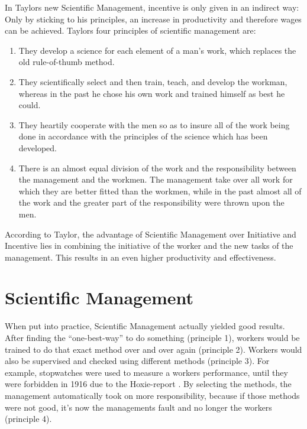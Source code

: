 \documentclass[a4paper,11pt]{article}
\newcommand{\enquote}[1]{``#1''}
\begin{document}
In Taylors new Scientific Management, incentive is only given in an indirect
way: Only by sticking to his principles, an increase in productivity and
therefore wages can be achieved. Taylors four principles of scientific
management are:
\begin{enumerate}
\item They develop a science for each element of a man's work, which replaces
  the old rule-of-thumb method.
\item They scientifically select and then train, teach, and develop the
  workman, whereas in the past he chose his own work and trained himself as
  best he could.
\item They heartily cooperate with the men so as to insure all of the work
  being done in accordance with the principles of the science which has been
  developed.
\item There is an almost equal division of the work and the responsibility
  between the management and the workmen. The management take over all work
  for which they are better fitted than the workmen, while in the past almost
  all of the work and the greater part of the responsibility were thrown upon
  the men.
\end{enumerate}

According to Taylor, the advantage of Scientific Management over Initiative
and Incentive lies in combining the initiative of the worker and the new tasks
of the management. This results in an even higher productivity and
effectiveness.

\section{Scientific Management}
When put into practice, Scientific Management actually yielded good
results. After finding the \enquote{one-best-way} to do something (principle
1), workers would be trained to do that exact method over and over again
(principle 2). Workers would also be supervised and checked using different
methods (principle 3). For example, stopwatches were used to measure a workers
performance, until they were forbidden in 1916 due to the Hoxie-report
\cite{hoxie}. By selecting the methods, the management automatically took on
more responsibility, because if those methods were not good, it's now the
managements fault and no longer the workers (principle 4).
\end{document}
